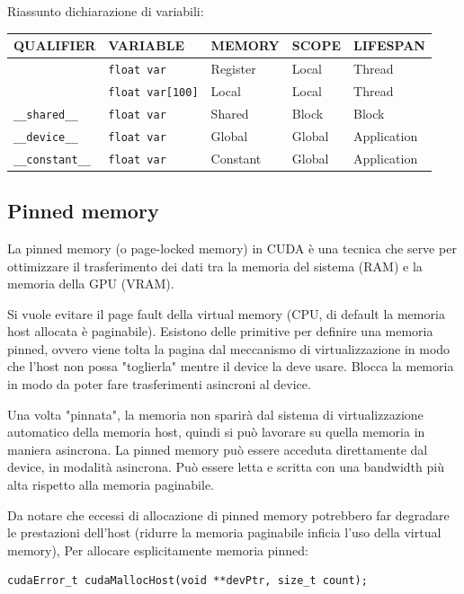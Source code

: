 Riassunto dichiarazione di variabili: 
\begin{center}
	\begin{tabular}{|l|l|l|l|l|}
		\hline
		\textbf{QUALIFIER} & \textbf{VARIABLE} & \textbf{MEMORY} & \textbf{SCOPE} & \textbf{LIFESPAN} \\
		\hline
		& \texttt{float var} & Register & Local & Thread \\
		\hline
		& \texttt{float var[100]} & Local & Local & Thread \\
		\hline
		\texttt{\_\_shared\_\_} & \texttt{float var} & Shared & Block & Block \\
		\hline
		\texttt{\_\_device\_\_} & \texttt{float var} & Global & Global & Application \\
		\hline
		\texttt{\_\_constant\_\_} & \texttt{float var} & Constant & Global & Application \\
		\hline
	\end{tabular}
\end{center}

\subsection{Pinned memory}
La pinned memory (o page-locked memory) in CUDA è una tecnica che serve per ottimizzare il trasferimento dei dati tra la memoria del sistema (RAM) e la memoria della GPU (VRAM). 

Si vuole evitare il page fault della virtual memory (CPU, di default la memoria host allocata è paginabile). Esistono delle primitive per definire una memoria pinned, ovvero viene tolta la pagina dal meccanismo di virtualizzazione in modo che l'host non possa "toglierla" mentre il device la deve usare. Blocca la memoria in modo da poter fare trasferimenti asincroni al device.

Una volta "pinnata", la memoria non sparirà dal sistema di virtualizzazione automatico della memoria host, quindi si può lavorare su quella memoria in maniera asincrona. La pinned memory può essere acceduta direttamente dal device, in modalità asincrona. Può essere letta e scritta con una bandwidth più alta rispetto alla memoria paginabile.

Da notare che eccessi di allocazione di pinned memory potrebbero far degradare le prestazioni dell'host (ridurre la memoria paginabile inficia l'uso della virtual memory), Per allocare esplicitamente memoria pinned:
\begin{verbatim}
cudaError_t cudaMallocHost(void **devPtr, size_t count);
\end{verbatim}

